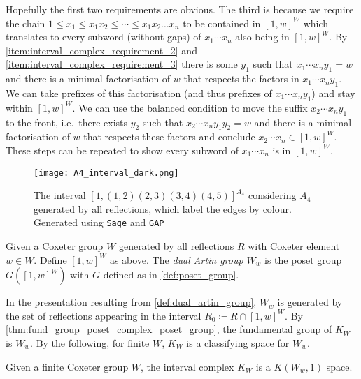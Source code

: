 \documentclass[class=article, crop=false]{standalone}
\begin{document}
Hopefully the first two requirements are obvious. The third is because we require the chain $1 \leq x_1 \leq x_1x_2 \leq \cdots \leq x_1x_2\ldots x_{n}$ to be contained in $[1,w]^W$ which translates to every subword (without gaps) of $x_1\cdots x_n$ also being in $[1,w]^W$. By \eqref{item:interval_complex_requirement_2} and \eqref{item:interval_complex_requirement_3} there is some $y_1$ such that $x_1 \cdots x_n y_1 = w$ and there is a minimal factorisation of $w$ that respects the factors in $ x_1 \cdots x_n y_1$.
We can take prefixes of this factorisation (and thus prefixes of $ x_1 \cdots x_n y_1$) and stay within $[1,w]^W$. We can use the balanced condition to move the suffix $x_2\cdots x_n y_1$ to the front, i.e.~there exists $y_2$ such that $x_2\cdots x_n y_1y_2=w$ and there is a minimal factorisation of $w$ that respects these factors and conclude $x_2\cdots x_n \in [1,w]^W$. These steps can be repeated to show every subword of $x_1 \cdots x_n $ is in $[1,w]^W$.

\begin{figure}
	\centering
	\texttt{[image: A4\_interval\_dark.png]}
	\caption{The interval $[1, (1,2)(2,3)(3,4)(4,5)]^{A_4}$ considering $A_4$ generated by all reflections, which label the edges by colour. Generated using \texttt{Sage} and \texttt{GAP} \cite{sagemath_2020, gap_2022}}
	\label{fig:A4_interval}
\end{figure}

\begin{definition}
	Given a Coxeter group $W$ generated by all reflections $R$ with Coxeter element $w \in W$. Define $[1,w]^W$ as above. The \emph{dual Artin group} $W_w$ is the poset group $G([1,w]^W)$ with $G$ defined as in \cref{def:poset_group}.
	\label{def:dual_artin_group}
\end{definition}

In the presentation resulting from \cref{def:dual_artin_group}, $W_w$ is generated by the set of reflections appearing in the interval $R_0 \coloneq R \cap [1,w]^W$.
By \cref{thm:fund_group_poset_complex_poset_group}, the fundamental group of $K_{W}$ is $W_w$. By the following, for finite $W$, $K_W$ is a classifying space for $W_w$.

\begin{theorem}
	Given a finite Coxeter group $W$, the interval complex $K_W$ is a $K(W_w,1)$ space.
	\label{thm:interval_cx_k_pi_1_finite}
\end{theorem}
\end{document}
